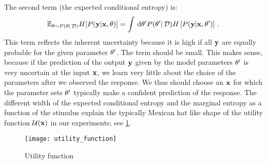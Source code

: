 The second term (the expected conditional entropy) is:
\begin{align}
	\mathbb{E}_{\theta \sim {P(\theta| \,\mathcal{D})}} H[{P({\bf y} | {\bf x}, \theta)}]
	= \int \,\mathrm{d} \theta' {P(\theta'|\,\mathcal{D})} H\left[{P({\bf y} | {\bf x}, \theta')}\right] \,.
\end{align} 
This term reflects the inherent uncertainty because it is high if all ${\bf y}$ are equally probable for the given parameter $\theta'$. The term should be small. This makes sense, because if the prediction of the output ${\bf y}$ given by the model parameters $\theta'$ is very uncertain at the input ${\bf x}$, we learn very little about the choice of the parameters after we observed the response. We thus should choose an ${\bf x}$ for which the parameter sets $\theta'$ typically make a confident prediction of the response.
The different width of the expected conditional entropy and the marginal entropy as a function of the stimulus explain the typically Mexican hat like shape of the utility function $\mathcal{U}({\bf x})$ in our experiments; see \cref{fig:utility_function}.

\begin{figure}
	\centering
	\texttt{[image: utility\_function]}
	\caption{Utility function}\label{fig:utility_function}
\end{figure}
